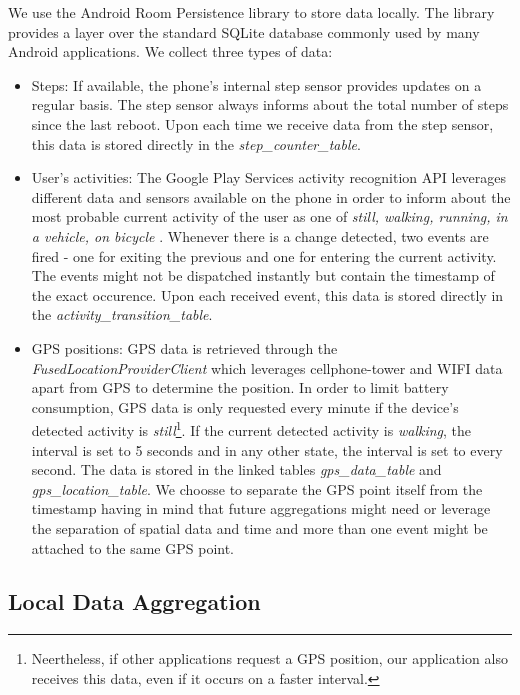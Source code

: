We use the Android Room Persistence library \parencite{room} to store data locally. The library provides a layer over the standard SQLite database commonly used by many Android applications. We collect three types of data:
\begin{itemize}
	\item Steps: If available, the phone's internal step sensor provides updates on a regular basis. The step sensor always informs about the total number of steps since the last reboot. Upon each time we receive data from the step sensor, this data is stored directly in the \textit{step\_counter\_table}.
	\item User's activities: The Google Play Services  activity recognition API leverages different data and sensors available on the phone in order to inform about the most probable current activity of the user as one of \textit{still, walking, running, in a vehicle, on bicycle} \parencite{detected-activity}. Whenever there is a change detected, two events are fired - one for exiting the previous and one for entering the current activity. The events might not be dispatched instantly but contain the timestamp of the exact occurence. Upon each received event, this data is stored directly in the \textit{activity\_transition\_table}.
	\item GPS positions: GPS data is retrieved through the \textit{FusedLocationProviderClient} which leverages cellphone-tower and WIFI data apart from GPS to determine the position. In order to limit battery consumption, GPS data is only requested every minute if the device's detected activity is \textit{still}\footnote{Neertheless, if other applications request a GPS position, our application also receives this data, even if it occurs on a faster interval.}. If the current detected activity is \textit{walking}, the interval is set to 5 seconds and in any other state, the interval is set to every second. The data is stored in the linked tables \textit{gps\_data\_table} and \textit{gps\_location\_table}. We choosse to separate the GPS point itself from the timestamp having in mind that future aggregations might need or leverage the separation of spatial data and time and more than one event might be attached to the same GPS point.
\end{itemize}

\subsection{Local Data Aggregation}\label{local-data-aggregation}

